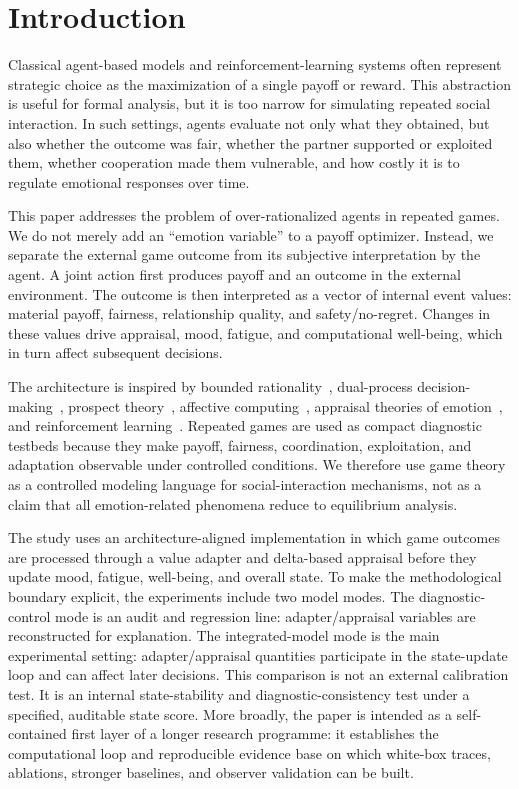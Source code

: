 \documentclass[runningheads]{llncs}
\begin{document}
\section{Introduction}
Classical agent-based models and reinforcement-learning systems often represent strategic choice as the maximization of a single payoff or reward. This abstraction is useful for formal analysis, but it is too narrow for simulating repeated social interaction. In such settings, agents evaluate not only what they obtained, but also whether the outcome was fair, whether the partner supported or exploited them, whether cooperation made them vulnerable, and how costly it is to regulate emotional responses over time.

This paper addresses the problem of over-rationalized agents in repeated games. We do not merely add an ``emotion variable'' to a payoff optimizer. Instead, we separate the external game outcome from its subjective interpretation by the agent. A joint action first produces payoff and an outcome in the external environment. The outcome is then interpreted as a vector of internal event values: material payoff, fairness, relationship quality, and safety/no-regret. Changes in these values drive appraisal, mood, fatigue, and computational well-being, which in turn affect subsequent decisions.

The architecture is inspired by bounded rationality~\cite{simon1955behavioral}, dual-process decision-making~\cite{kahneman2011thinking}, prospect theory~\cite{kahneman1979prospect}, affective computing~\cite{picard1997affective}, appraisal theories of emotion~\cite{ortony1988cognitive,marsella2009ema}, and reinforcement learning~\cite{sutton2018reinforcement,mnih2015human}. Repeated games are used as compact diagnostic testbeds because they make payoff, fairness, coordination, exploitation, and adaptation observable under controlled conditions. We therefore use game theory as a controlled modeling language for social-interaction mechanisms, not as a claim that all emotion-related phenomena reduce to equilibrium analysis.

The study uses an architecture-aligned implementation in which game outcomes are processed through a value adapter and delta-based appraisal before they update mood, fatigue, well-being, and overall state. To make the methodological boundary explicit, the experiments include two model modes. The diagnostic-control mode is an audit and regression line: adapter/appraisal variables are reconstructed for explanation. The integrated-model mode is the main experimental setting: adapter/appraisal quantities participate in the state-update loop and can affect later decisions. This comparison is not an external calibration test. It is an internal state-stability and diagnostic-consistency test under a specified, auditable state score. More broadly, the paper is intended as a self-contained first layer of a longer research programme: it establishes the computational loop and reproducible evidence base on which white-box traces, ablations, stronger baselines, and observer validation can be built.
\end{document}
